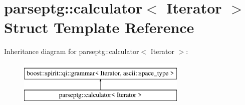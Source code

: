 \hypertarget{structparseptg_1_1calculator}{}\section{parseptg\+:\+:calculator$<$ Iterator $>$ Struct Template Reference}
\label{structparseptg_1_1calculator}
Inheritance diagram for parseptg\+:\+:calculator$<$ Iterator $>$\+:\begin{figure}[H]
\begin{center}
\leavevmode
\includegraphics[height=2.000000cm]{structparseptg_1_1calculator}
\end{center}
\end{figure}
